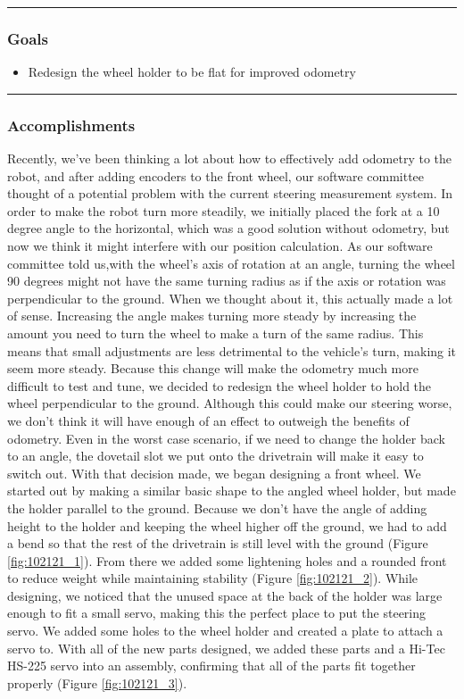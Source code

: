 \noindent\hfil\rule{\textwidth}{.4pt}\hfil
\subsubsection*{Goals}
\begin{itemize}
    \item Redesign the wheel holder to be flat for improved odometry

\end{itemize} 

\noindent\hfil\rule{\textwidth}{.4pt}\hfil

\subsubsection*{Accomplishments}
Recently, we’ve been thinking a lot about how to effectively add odometry to the robot, and after adding encoders to the front wheel, our software committee thought of a potential problem with the current steering measurement system. In order to make the robot turn more steadily, we initially placed the fork at a 10 degree angle to the horizontal, which was a good solution without odometry, but now we think it might interfere with our position calculation. As our software committee told us,with the wheel’s axis of rotation at an angle, turning the wheel 90 degrees might not have the same turning radius as if the axis or rotation was perpendicular to the ground. When we thought about it, this actually made a lot of sense. Increasing the angle makes turning more steady by increasing the amount you need to turn the wheel to make a turn of the same radius. This means that small adjustments are less detrimental to the vehicle's turn, making it seem more steady. Because this change will make the odometry much more difficult to test and tune, we decided to redesign the wheel holder to hold the wheel perpendicular to the ground. Although this could make our steering worse, we don’t think it will have enough of an effect to outweigh the benefits of odometry. Even in the worst case scenario, if we need to change the holder back to an angle, the dovetail slot we put onto the drivetrain will make it easy to switch out.
With that decision made, we began designing a front wheel. We started out by making a similar basic shape to the angled wheel holder, but made the holder parallel to the ground. Because we don't have the angle of adding height to the holder and keeping the wheel higher off the ground, we had to add a bend so that the rest of the drivetrain is still level with the ground (Figure \ref{fig:102121_1}). From there we added some lightening holes and a rounded front to reduce weight while maintaining stability (Figure \ref{fig:102121_2}). While designing, we noticed that the unused space at the back of the holder was large enough to fit a small servo, making this the perfect place to put the steering servo. We added some holes to the wheel holder and created a plate to attach a servo to. With all of the new parts designed, we added these parts and a Hi-Tec HS-225 servo into an assembly, confirming that all of the parts fit together properly (Figure \ref{fig:102121_3}).

